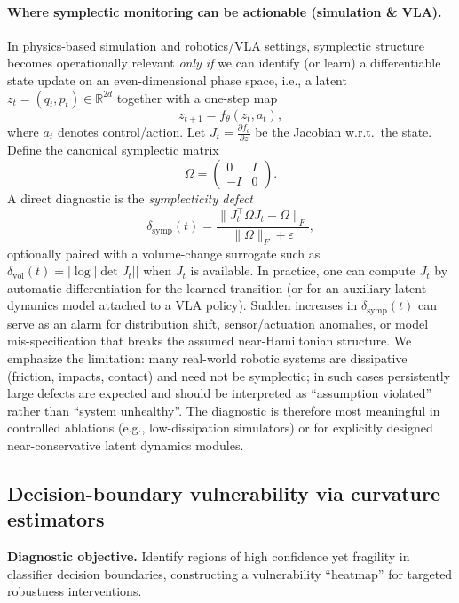 \documentclass[11pt]{article}
\newcommand{\R}{\mathbb{R}}
\newcommand{\abs}[1]{\left\lvert #1 \right\rvert}
\newcommand{\eps}{\varepsilon}
\begin{document}
\paragraph{Where symplectic monitoring can be actionable (simulation \& VLA).}
In physics-based simulation and robotics/VLA settings, symplectic structure becomes operationally relevant \emph{only if} we can identify (or learn) a differentiable state update on an even-dimensional phase space, i.e., a latent $z_t=(q_t,p_t)\in\R^{2d}$ together with a one-step map
\[
z_{t+1}=f_\theta(z_t,a_t),
\]
where $a_t$ denotes control/action. Let $J_t=\frac{\partial f_\theta}{\partial z}$ be the Jacobian w.r.t.\ the state. Define the canonical symplectic matrix
\[
\Omega=\begin{pmatrix}0&I\\-I&0\end{pmatrix}.
\]
A direct diagnostic is the \emph{symplecticity defect}
\[
\delta_{\mathrm{symp}}(t)=\frac{\|J_t^\top \Omega J_t-\Omega\|_F}{\|\Omega\|_F+\eps},
\]
optionally paired with a volume-change surrogate such as $\delta_{\mathrm{vol}}(t)=\abs{\log\abs{\det J_t}}$ when $J_t$ is available. In practice, one can compute $J_t$ by automatic differentiation for the learned transition (or for an auxiliary latent dynamics model attached to a VLA policy). Sudden increases in $\delta_{\mathrm{symp}}(t)$ can serve as an alarm for distribution shift, sensor/actuation anomalies, or model mis-specification that breaks the assumed near-Hamiltonian structure.
We emphasize the limitation: many real-world robotic systems are dissipative (friction, impacts, contact) and need not be symplectic; in such cases persistently large defects are expected and should be interpreted as ``assumption violated'' rather than ``system unhealthy''. The diagnostic is therefore most meaningful in controlled ablations (e.g., low-dissipation simulators) or for explicitly designed near-conservative latent dynamics modules.
\subsection{Decision-boundary vulnerability via curvature estimators}

\textbf{Diagnostic objective.}
Identify regions of high confidence yet fragility in classifier decision boundaries, constructing a vulnerability ``heatmap'' for targeted robustness interventions.
\end{document}
